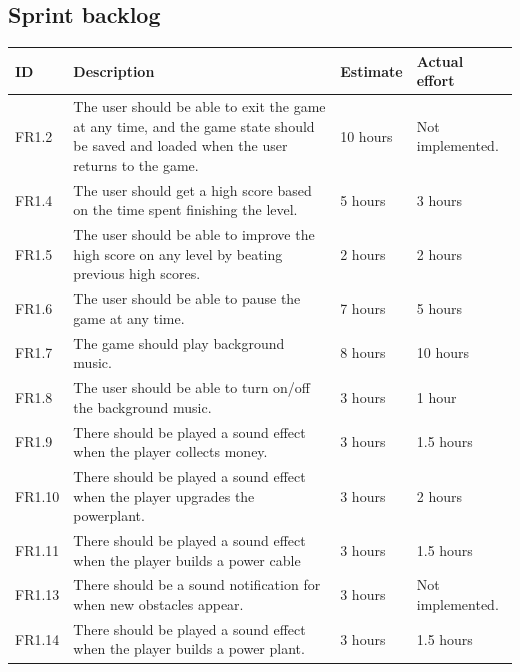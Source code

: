 \subsection{Sprint backlog}
	\begin{table} [H]
	\begin{tabular}{| p{1cm} | p{7cm} | p{2cm} | p{2cm} |}
		\hline
		\rowcolor{gray}
		ID & Description & Estimate & Actual effort \\ \hline
		FR1.2 &  The user should be able to exit the game at any time, and the game state should be saved and loaded when the user returns to the game. 
		& 10 hours & Not implemented. \\ \hline

		FR1.4 & The user should get a high score based on the time spent finishing the level. 
		& 5 hours & 3 hours \\ \hline

		FR1.5 & The user should be able to improve the high score on any level by beating previous high scores. 
		& 2 hours & 2 hours  \\ \hline

		FR1.6 & The user should be able to pause the game at any time. 
		& 7 hours & 5 hours \\ \hline

		FR1.7 & The game should play background music. 
		& 8 hours & 10 hours \\ \hline

		FR1.8 & The user should be able to turn on/off the background music. 
		& 3 hours & 1 hour \\ \hline

		FR1.9 & There should be played a sound effect when the player collects money. 
		& 3 hours & 1.5 hours \\ \hline

		FR1.10 & There should be played a sound effect when the player upgrades the powerplant. 
		& 3 hours & 2 hours \\ \hline

		FR1.11 & There should be played a sound effect when the player builds a power cable 
		& 3 hours & 1.5 hours \\ \hline

		FR1.13 & There should be a sound notification for when new obstacles appear. 
		& 3 hours & Not implemented. \\ \hline

		FR1.14 & There should be played a sound effect when the player builds a power plant. 
		& 3 hours & 1.5 hours \\ \hline


\end{tabular}
\end{table}
